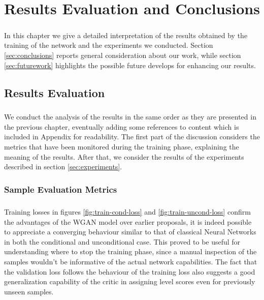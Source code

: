 \chapter{Results Evaluation and Conclusions}
\label{ch:results-conclusion}
\paragraph{} In this chapter we give a detailed interpretation of the results obtained by the training of the network and the experiments we conducted. Section \ref{sec:conclusions} reports general consideration about our work, while section \ref{sec:futurework} highlights the possible future develops for enhancing our results.

\section{Results Evaluation}

\paragraph{} We conduct the analysis of the results in the same order as they are presented in the previous chapter, eventually adding some references to content which is included in Appendix for readability. The first part of the discussion considers the metrics that have been monitored during the training phase, explaining the meaning of the results. After that, we consider the results of the experiments described in section \ref{sec:experiments}.
\subsection{Sample Evaluation Metrics}
\paragraph{} Training losses in figures \ref{fig:train-cond-loss} and \ref{fig:train-uncond-loss} confirm the advantages of the WGAN model over earlier proposals, it is indeed possible to appreciate a converging behaviour similar to that of classical Neural Networks in both the conditional and unconditional case. This proved to be useful for understanding where to stop the training phase, since a manual inspection of the samples wouldn't be informative of the actual network capabilities. The fact that the validation loss follows the behaviour of the training loss also suggests a good generalization capability of the critic in assigning level scores even for previously unseen samples. 

